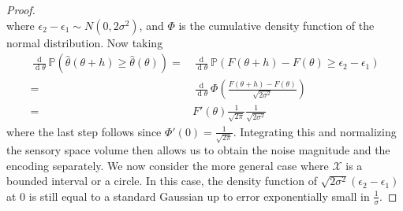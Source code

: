\begin{proof}
\begin{equation}
\end{equation}
where $\epsilon_2-\epsilon_1 \sim N(0,2\sigma^2)$, and $\Phi$ is the cumulative density function of the normal distribution. %
Now taking
\begin{align*}
 \frac{\operatorname{d}}{\operatorname{d}\theta}  \mathbb{P}(\widehat{\theta}(\theta+h) \geq \widehat{\theta}(\theta)) 
= & \frac{\operatorname{d}}{\operatorname{d}\theta}  \mathbb{P}(F(\theta+h) - F(\theta) \geq \epsilon_2-\epsilon_1) \\
    =&  \frac{\operatorname{d}}{\operatorname{d}\theta}  \Phi\left(\frac{F(\theta+h) - F(\theta)}{\sqrt{2\sigma^2}}\right) \\
    = & F'(\theta) \frac{1}{\sqrt{2\pi}} \frac{1}{\sqrt{2\sigma^2}}
\end{align*}
where the last step follows since $\Phi'(0) = \frac{1}{\sqrt{2\pi}}$.
Integrating this and normalizing the sensory space volume then allows us to obtain the noise magnitude and the encoding separately.
We now consider the more general case where $\mathcal{X}$ is a bounded interval or a circle. In this case, the density function of $\sqrt{2\sigma^2}\left(\epsilon_2-\epsilon_1\right)$ at 0 is still equal to a standard Gaussian up to error exponentially small in $\frac{1}{\sigma}$.
\end{proof}

